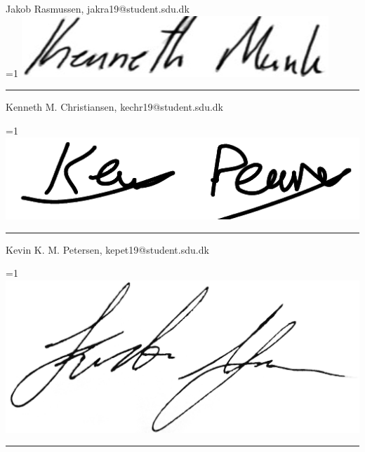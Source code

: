 Jakob Rasmussen, jakra19@student.sdu.dk\\


\ifnum \value{PROD}=1
    \includegraphics[scale=0.3]{figures/signatures/signature_kechr19.PNG}
    \vspace{-5mm}
\fi
\par\rule{\textwidth}{0.4pt}

Kenneth M. Christiansen, kechr19@student.sdu.dk\\
\vspace{3.5mm}

\vspace{-6.5mm}

\ifnum \value{PROD}=1
    \includegraphics[scale=0.3]{figures/signatures/signature_kepet19.png}
    \vspace{-8mm}
\fi
\par\rule{\textwidth}{0.4pt}

Kevin K. M. Petersen, kepet19@student.sdu.dk


\ifnum \value{PROD}=1
    \includegraphics[scale=0.04]{figures/signatures/signature_kjako19.jpg}
    \vspace{-9.5mm}
\fi
\par\rule{\textwidth}{0.4pt}

